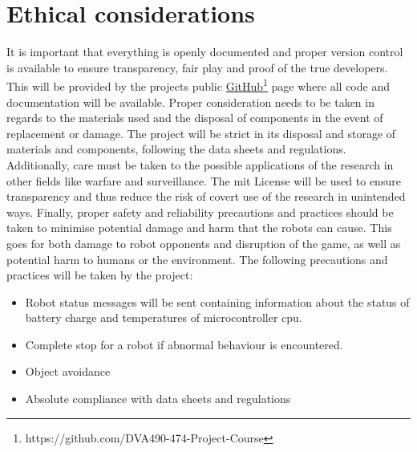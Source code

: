 \section{Ethical considerations}
\label{section:ethical_considerations}

It is important that everything is openly documented and proper version control is available to ensure transparency, fair play and proof of the true developers. This will be provided by the projects public \href{https://github.com/DVA490-474-Project-Course}{GitHub}\footnote{https://github.com/DVA490-474-Project-Course} page where all code and documentation will be available.
Proper consideration needs to be taken in regards to the materials used and the disposal of components in the event of replacement or damage. The project will be strict in its disposal and storage of materials and components, following the data sheets and regulations.
Additionally, care must be taken to the possible applications of the research in other fields like warfare and surveillance. The \acs{mit} License will be used to ensure transparency and thus reduce the risk of covert use of the research in unintended ways. 
Finally, proper safety and reliability precautions and practices should be taken to minimise potential damage and harm that the robots can cause. This goes for both damage to robot opponents and disruption of the game, as well as potential harm to humans or the environment. The following precautions and practices will be taken by the project:
\begin{itemize}
    \item Robot status messages will be sent containing information about the status of battery charge and temperatures of microcontroller \acs{cpu}.
    \item Complete stop for a robot if abnormal behaviour is encountered.
    \item Object avoidance
    \item Absolute compliance with data sheets and regulations
\end{itemize}

